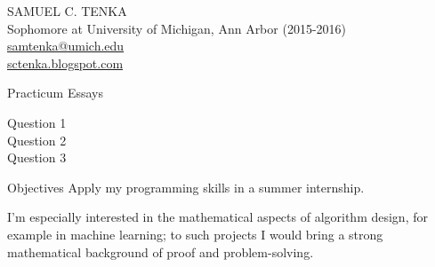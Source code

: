 \documentclass[12pt]{article}
\begin{document}

\begin{center}
 \LARGE SAMUEL C. TENKA \\
 \normalsize Sophomore at University of Michigan, Ann Arbor (2015-2016) \\
 \href{mailto:samtenka@umich.edu}{samtenka@umich.edu} \\
 \href{http://sctenka.blogspot.com}{sctenka.blogspot.com} \\
 \vspace{0mm}
\end{center}

\begin{section}{Practicum Essays}
\begin{description}
\item[Question 1] %


\item[Question 2] %


\item[Question 3] %


\end{description}
\end{section}


\begin{section}{Objectives}
 Apply my programming skills in a summer internship. 
 
 I'm especially interested in the mathematical aspects of algorithm design, for example in machine learning; to such projects I would bring a strong mathematical background of proof and problem-solving.
\end{section}
\end{document}
